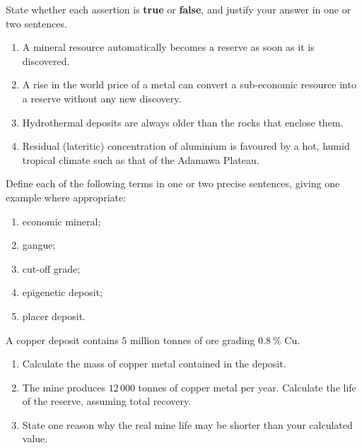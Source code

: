 \documentclass[11pt]{article}
\newcommand{\cle}[1]{{\popxbold\color{popdark}#1}}
\newcounter{popsec}
\newcounter{popsub}
\newcommand{\courssub}[1]{%
  \stepcounter{popsub}%
  \par\vspace{9pt}\noindent{\popxbold\fontsize{11.5}{13}\selectfont\color{popink}{\color{poporange}\thepopsec.\thepopsub}\hspace{6pt}#1}\par\nopagebreak\vspace{4pt}
}
\begin{document}
\begin{exercice}
State whether each assertion is \textbf{true} or \textbf{false}, and justify your answer in one or two sentences.
\begin{enumerate}
\item A mineral resource automatically becomes a reserve as soon as it is discovered.
\item A rise in the world price of a metal can convert a sub-economic resource into a reserve without any new discovery.
\item Hydrothermal deposits are always older than the rocks that enclose them.
\item Residual (lateritic) concentration of aluminium is favoured by a hot, humid tropical climate such as that of the Adamawa Plateau.
\end{enumerate}
\end{exercice}

\begin{exercice}
Define each of the following terms in one or two precise sentences, giving one example where appropriate:
\begin{enumerate}
\item \cle{economic mineral};
\item \cle{gangue};
\item \cle{cut-off grade};
\item \cle{epigenetic deposit};
\item \cle{placer deposit}.
\end{enumerate}
\end{exercice}

\begin{exercice}
A copper deposit contains $5$ million tonnes of ore grading $0.8\ \%$ Cu.
\begin{enumerate}
\item Calculate the mass of copper metal contained in the deposit.
\item The mine produces $12\,000$ tonnes of copper metal per year. Calculate the life of the reserve, assuming total recovery.
\item State one reason why the real mine life may be shorter than your calculated value.
\end{enumerate}
\end{exercice}

\courssub{I practise}
\end{document}
